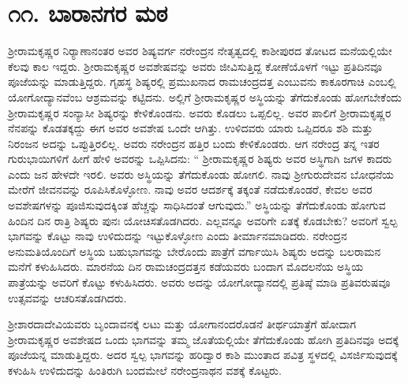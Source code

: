 
\chapter*{೧೧. ಬಾರಾನಗರ ಮಠ }

ಶ‍್ರೀರಾಮಕೃಷ್ಣರ ನಿರ‍್ಯಾಣಾನಂತರ ಅವರ ಶಿಷ್ಯವರ್ಗ ನರೇಂದ್ರನ ನೇತೃತ್ವದಲ್ಲಿ ಕಾಶೀಪುರದ ತೋಟದ ಮನೆಯಲ್ಲಿಯೇ ಕೆಲವು ಕಾಲ ಇದ್ದರು. ಶ‍್ರೀರಾಮಕೃಷ್ಣರ ಅವಶೇಷವನ್ನು ಅವರು ಜೀವಿಸುತ್ತಿದ್ದ ಕೋಣೆಯೊಳಗೆ ಇಟ್ಟು ಪ್ರತಿದಿನವೂ ಪೂಜೆಯನ್ನು ಮಾಡುತ್ತಿದ್ದರು. ಗೃಹಸ್ಥ ಶಿಷ್ಯರಲ್ಲಿ ಪ್ರಮುಖನಾದ ರಾಮಚಂದ್ರದತ್ತ ಎಂಬುವನು ಕಾಕೂರಗಾಚಿ ಎಂಬಲ್ಲಿ ಯೋಗೋದ್ಯಾನವೆಂಬ ಆಶ್ರಮವನ್ನು ಕಟ್ಟಿದನು. ಅಲ್ಲಿಗೆ ಶ‍್ರೀರಾಮಕೃಷ್ಣರ ಅಸ್ಥಿಯನ್ನು ತೆಗೆದುಕೊಂಡು ಹೋಗಬೇಕೆಂದು ಶ‍್ರೀರಾಮಕೃಷ್ಣರ ಸಂನ್ಯಾಸೀ ಶಿಷ್ಯರನ್ನು ಕೇಳಿಕೊಂಡನು. ಅವರು ಕೊಡಲು ಒಪ್ಪಲಿಲ್ಲ. ಅವರ ಪಾಲಿಗೆ ಶ‍್ರೀರಾಮಕೃಷ್ಣರ ನೆನಪನ್ನು ಕೊಡತಕ್ಕದ್ದು ಈಗ ಅವರ ಅವಶೇಷ ಒಂದೇ ಆಗಿತ್ತು. ಉಳಿದವರು ಯಾರು ಒಪ್ಪಿದರೂ ಶಶಿ ಮತ್ತು ನಿರಂಜನ ಅದನ್ನು ಒಪ್ಪುತ್ತಿರಲಿಲ್ಲ. ಅವರು ನರೇಂದ್ರನ ಹತ್ತಿರ ಬಂದು ಕೇಳಿಕೊಂಡರು. ಆಗ ನರೇಂದ್ರ ತನ್ನ ಇತರ ಗುರುಭಾಯಿಗಳಿಗೆ ಹೀಗೆ ಹೇಳಿ ಅವರನ್ನು ಒಪ್ಪಿಸಿದನು: “ ಶ‍್ರೀರಾಮಕೃಷ್ಣರ ಶಿಷ್ಯರು ಅವರ ಅಸ್ಥಿಗಾಗಿ ಜಗಳ ಕಾದರು ಎಂದು ಜನ ಹೇಳದೇ ಇರಲಿ. ಅವರು ಅಸ್ಥಿಯನ್ನು ತೆಗೆದುಕೊಂಡು ಹೋಗಲಿ. ನಾವು ಶ‍್ರೀಗುರುದೇವನ ಬೋಧನೆಯ ಮೇರೆಗೆ ಜೀವನವನ್ನು ರೂಪಿಸಿಕೊಳ್ಳೋಣ. ನಾವು ಅವರ ಆದರ್ಶಕ್ಕೆ ತಕ್ಕಂತೆ ನಡೆದುಕೊಂಡರೆ, ಕೇವಲ ಅವರ ಅವಶೇಷಗಳನ್ನು ಪೂಜಿಸುವುದಕ್ಕಿಂತ ಹೆಚ್ಚನ್ನು ಸಾಧಿಸಿದಂತೆ ಆಗುವುದು.” ಅಸ್ಥಿಯನ್ನು ತೆಗೆದುಕೊಂಡು ಹೋಗುವ ಹಿಂದಿನ ದಿನ ರಾತ್ರಿ ಶಿಷ್ಯರು ಪುನಃ ಯೋಚಿಸತೊಡಗಿದರು. ಎಲ್ಲವನ್ನೂ ಅವರಿಗೇ ಏತಕ್ಕೆ ಕೊಡಬೇಕು? ಅವರಿಗೆ ಸ್ವಲ್ಪ ಭಾಗವನ್ನು ಕೊಟ್ಟು ನಾವು ಉಳಿದುದನ್ನು ಇಟ್ಟುಕೊಳ್ಳೋಣ ಎಂದು ತೀರ್ಮಾನಮಾಡಿದರು. ನರೇಂದ್ರನ ಅನುಮತಿಯೊಂದಿಗೆ ಅಸ್ಥಿಯ ಬಹುಭಾಗವನ್ನು ಬೇರೊಂದು ಪಾತ್ರೆಗೆ ವರ್ಗಾಯಿಸಿ ಶಿಷ್ಯರು ಅದನ್ನು ಬಲರಾಮನ ಮನೆಗೆ ಕಳುಹಿಸಿದರು. ಮಾರನೆಯ ದಿನ ರಾಮಚಂದ್ರದತ್ತನ ಕಡೆಯವರು ಬಂದಾಗ ಮೊದಲನೆಯ ಅಸ್ಥಿಯ ಪಾತ್ರೆಯನ್ನು ಅವರಿಗೆ ಕೊಟ್ಟು ಕಳುಹಿಸಿದರು. ಅವರು ಅದನ್ನು ಯೋಗೋದ್ಯಾನದಲ್ಲಿ ಪ್ರತಿಷ್ಠೆ ಮಾಡಿ ಪ್ರತಿವರುಷವೂ ಉತ್ಸವವನ್ನು ಆಚರಿಸತೊಡಗಿದರು.

ಶ‍್ರೀಶಾರದಾದೇವಿಯವರು ಬೃಂದಾವನಕ್ಕೆ ಲಟು ಮತ್ತು ಯೋಗಾನಂದರೊಡನೆ ತೀರ್ಥಯಾತ್ರೆಗೆ ಹೋದಾಗ ಶ‍್ರೀರಾಮಕೃಷ್ಣರ ಅವಶೇಷದ ಒಂದು ಭಾಗವನ್ನು ತಮ್ಮ ಜೊತೆಯಲ್ಲಿಯೇ ತೆಗೆದುಕೊಂಡು ಹೋಗಿ ಪ್ರತಿದಿನವೂ ಅದಕ್ಕೆ ಪೂಜೆಯನ್ನ ಮಾಡುತ್ತಿದ್ದರು. ಅದರ ಸ್ವಲ್ಪ ಭಾಗವನ್ನು ಹರಿದ್ವಾರ ಕಾಶಿ ಮುಂತಾದ ಪವಿತ್ರ ಸ್ಥಳದಲ್ಲಿ ವಿಸರ್ಜಿಸುವುದಕ್ಕೆ ಕಳುಹಿಸಿ ಉಳಿದುದನ್ನು ಹಿಂತಿರುಗಿ ಬಂದಮೇಲೆ ನರೇಂದ್ರನಾಥನ ವಶಕ್ಕೆ ಕೊಟ್ಟರು.

